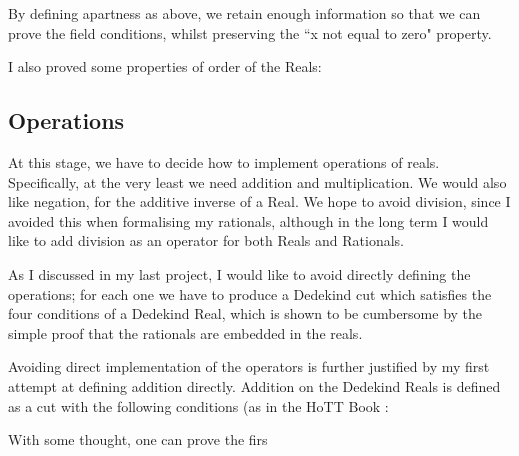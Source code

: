 \documentclass[ProjectReport]{subfiles}
\begin{document}
By defining apartness as above, we retain enough information so that we can prove the field conditions, whilst preserving the ``x not equal to zero" property.

I also proved some properties of order of the Reals:



\subsection{Operations}

At this stage, we have to decide how to implement operations of reals. Specifically, at the very least we need addition and multiplication. We would also like negation, for the additive inverse of a Real. We hope to avoid division, since I avoided this when formalising my rationals, although in the long term I would like to add division as an operator for both Reals and Rationals.


As I discussed in my last project, I would like to avoid directly defining the operations; for each one we have to produce a Dedekind cut which satisfies the four conditions of a Dedekind Real, which is shown to be cumbersome by the simple proof that the rationals are embedded in the reals. 

Avoiding direct implementation of the operators is further justified by my first attempt at defining addition directly. Addition on the Dedekind Reals is defined as a cut with the following conditions (as in the HoTT Book \cite{hottbook}:


With some thought, one can prove the firs
\end{document}
